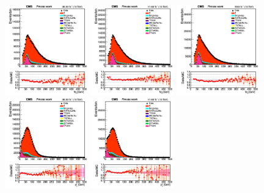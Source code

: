 \documentclass{cernatlasnote}
\begin{document}
  \begin{figure}[htp]
\centering
 \includegraphics[width=0.32\textwidth]{images/emu_channel/2016/16_Range_0pt7_1pt3/Dilepton_mass_filter_M20_MET40_Linear.png}
\includegraphics[width=0.32\textwidth]{images/emu_channel/2017/17_Range_0pt7_1pt3/Dilepton_mass_filter_M20_MET40_Linear.png}
 \includegraphics[width=0.32\textwidth]{images/emu_channel/2018/18_Range_0pt7_1pt3/Dilepton_mass_filter_M20_MET40_Linear.png}\\
 \includegraphics[width=0.32\textwidth]{images/emu_channel/2016/16_Range_0pt7_1pt3/Dilepton_pt_filter_M20_MET40_Linear.png}
\includegraphics[width=0.32\textwidth]{images/emu_channel/2017/17_Range_0pt7_1pt3/Dilepton_pt_filter_M20_MET40_Linear.png}

\end{figure}
\end{document}

